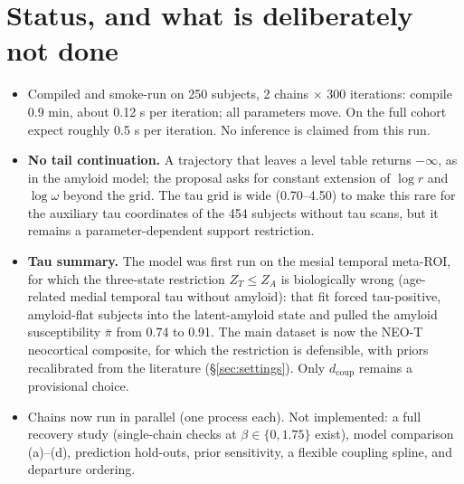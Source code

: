 \documentclass[11pt]{article}
\begin{document}
\section{Status, and what is deliberately not done}

\begin{itemize}[nosep]
\item Compiled and smoke-run on 250 subjects, 2 chains $\times$ 300 iterations:
compile 0.9 min, about 0.12 s per iteration; all parameters move. On the full cohort
expect roughly 0.5 s per iteration. No inference is claimed from this run.
\item \textbf{No tail continuation.} A trajectory that leaves a level table returns
$-\infty$, as in the amyloid model; the proposal asks for constant extension of
$\log r$ and $\log\omega$ beyond the grid. The tau grid is wide (0.70--4.50) to make
this rare for the auxiliary tau coordinates of the 454 subjects without tau scans,
but it remains a parameter-dependent support restriction.
\item \textbf{Tau summary.} The model was first run on the mesial temporal
meta-ROI, for which the three-state restriction $Z_T\le Z_A$ is biologically wrong
(age-related medial temporal tau without amyloid): that fit forced tau-positive,
amyloid-flat subjects into the latent-amyloid state and pulled the amyloid
susceptibility $\bar\pi$ from 0.74 to 0.91. The main dataset is now the NEO-T
neocortical composite, for which the restriction is defensible, with priors
recalibrated from the literature (\S\ref{sec:settings}). Only $d_{\mathrm{coup}}$
remains a provisional choice.
\item Chains now run in parallel (one process each). Not implemented: a full
recovery study (single-chain checks at $\beta\in\{0,1.75\}$ exist), model
comparison (a)--(d), prediction hold-outs, prior sensitivity, a flexible coupling
spline, and departure ordering.
\end{itemize}
\end{document}
